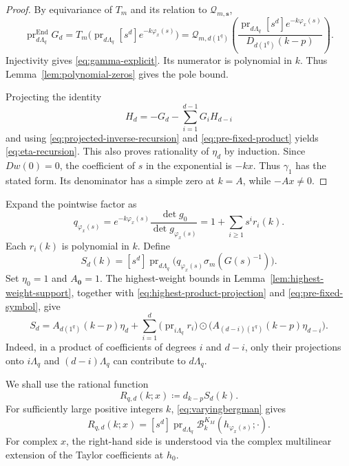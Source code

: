 \documentclass[11pt,reqno]{amsart}
\theoremstyle{corollary}
\theoremstyle{conjecture}
\theoremstyle{assumption}
\theoremstyle{proposition}
\theoremstyle{remark}
\numberwithin{equation}{section}
\begin{document}
\begin{proof}
By equivariance of $T_m$ and its relation to $\mathcal Q_{m,\mathbf s}$,
\[
\operatorname{pr}^{\operatorname{End}}_{d\Lambda_q}G_d=T_m\bigl(\operatorname{pr}_{d\Lambda_q}[s^d]e^{-k\varphi_x(s)}\bigr)
=\mathcal Q_{m,d(1^q)}\left(\frac{\operatorname{pr}_{d\Lambda_q}[s^d]e^{-k\varphi_x(s)}}{D_{d(1^q)}(k-p)}\right).
\]
Injectivity gives \eqref{eq:gamma-explicit}. Its numerator is polynomial in $k$. Thus Lemma~\ref{lem:polynomial-zeros} gives the pole bound.

Projecting the identity
\[
H_d=-G_d-\sum_{i=1}^{d-1}G_iH_{d-i}
\]
and using \eqref{eq:projected-inverse-recursion} and \eqref{eq:pre-fixed-product} yields \eqref{eq:eta-recursion}. This also proves rationality of $\eta_d$ by induction. Since $Dw(0)=0$, the coefficient of $s$ in the exponential is $-kx$. Thus $\gamma_1$ has the stated form. Its denominator has a simple zero at $k=A$, while $-Ax\neq 0$.
\end{proof}

Expand the pointwise factor as
\[
q_{\varphi_x(s)}=e^{-k\varphi_x(s)}\frac{\det g_0}{\det g_{\varphi_x(s)}}=1+\sum_{i\geq1}s^i r_i(k).
\]
Each $r_i(k)$ is polynomial in $k$.
Define
\[
S_d(k)=[s^d]\operatorname{pr}_{d\Lambda_q}\bigl(q_{\varphi_x(s)}\sigma_m(G(s)^{-1})\bigr).
\]
Set $\eta_0=1$ and $A_{\mathbf0}=1$. The highest-weight bounds in Lemma~\ref{lem:highest-weight-support}, together with \eqref{eq:highest-product-projection} and \eqref{eq:pre-fixed-symbol}, give
\begin{equation}\label{eq:projected-density-recursion}
S_d=A_{d(1^q)}(k-p)\eta_d+\sum_{i=1}^{d}\bigl(\operatorname{pr}_{i\Lambda_q}r_i\bigr)\odot\bigl(A_{(d-i)(1^q)}(k-p)\eta_{d-i}\bigr).
\end{equation}
Indeed, in a product of coefficients of degrees $i$ and $d-i$,
only their projections onto $i\Lambda_q$ and $(d-i)\Lambda_q$
can contribute to $d\Lambda_q$.

We shall use the rational function
\begin{equation}\label{eq:rational-density-coefficient}
R_{q,d}(k;x)\coloneq d_{k-p}S_d(k).
\end{equation}
For sufficiently large positive integers $k$, \eqref{eq:varyingbergman} gives
\begin{equation}\label{eq:rational-density-identification}
R_{q,d}(k;x)=[s^d]\operatorname{pr}_{d\Lambda_q}\mathcal B_k^{K_M}(h_{\varphi_x(s)};\cdot).
\end{equation}
For complex $x$, the right-hand side is understood via the complex multilinear extension of the Taylor coefficients at $h_0$.
\end{document}
